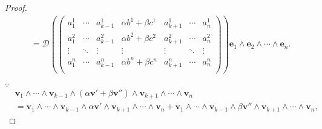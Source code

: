 \documentclass{ctexart}
\begin{document}
\begin{proof}
\begin{align*}
        & =\mathcal{D}\left(\begin{pmatrix}
            a_1^1 & \cdots & a_{k-1}^1 & \alpha b^1+\beta c^1 & a_{k+1}^1 & \cdots & a_n^1 \\
            a_1^2 & \cdots & a_{k-1}^2 & \alpha b^2+\beta c^2 & a_{k+1}^2 & \cdots & a_n^2 \\
            \vdots & \ddots & \vdots & \vdots & \vdots & \ddots & \vdots \\
            a_1^n & \cdots & a_{k-1}^n & \alpha b^n+\beta c^n & a_{k+1}^n & \cdots & a_n^n \\
        \end{pmatrix}\right)\boldsymbol{e}_1\wedge\boldsymbol{e}_2\wedge\cdots\wedge\boldsymbol{e}_n.
    \end{align*}

    $\because$
    \begin{align*}
        & \boldsymbol{v}_1\wedge\cdots\wedge\boldsymbol{v}_{k-1}\wedge(\alpha\boldsymbol{v}'+\beta\boldsymbol{v}'')\wedge\boldsymbol{v}_{k+1}\wedge\cdots\wedge\boldsymbol{v}_n \\
        & =\boldsymbol{v}_1\wedge\cdots\wedge\boldsymbol{v}_{k-1}\wedge\alpha\boldsymbol{v}'\wedge\boldsymbol{v}_{k+1}\wedge\cdots\wedge\boldsymbol{v}_n+\boldsymbol{v}_1\wedge\cdots\wedge\boldsymbol{v}_{k-1}\wedge\beta\boldsymbol{v}''\wedge\boldsymbol{v}_{k+1}\wedge\cdots\wedge\boldsymbol{v}_n,
    \end{align*}


\end{proof}
\end{document}
